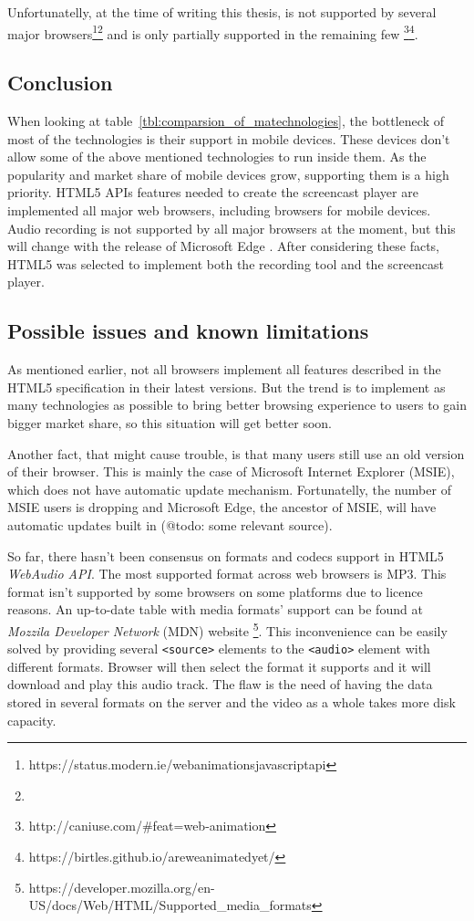 Unfortunatelly, at the time of writing this thesis, is not supported by several major browsers\footnote{https://status.modern.ie/webanimationsjavascriptapi}\footnote{} and is only partially supported in the remaining few \footnote{http://caniuse.com/\#feat=web-animation}\footnote{https://birtles.github.io/areweanimatedyet/}.

\subsection{Conclusion}
When looking at table~\ref{tbl:comparsion_of_matechnologies}, the bottleneck of most of the technologies is their support in mobile devices. These devices don't allow some of the above mentioned technologies to run inside them. As the popularity and market share of mobile devices grow, supporting them is a high priority. HTML5 APIs features needed to create the screencast player are implemented all major web browsers, including browsers for mobile devices. Audio recording is not supported by all major browsers at the moment, but this will change with the release of Microsoft Edge \cite{edge_getusermedia}. After considering these facts, HTML5 was selected to implement both the recording tool and the screencast player.

\subsection{Possible issues and known limitations}
As mentioned earlier, not all browsers implement all features described in the HTML5 specification in their latest versions. But the trend is to implement as many technologies as possible to bring better browsing experience to users to gain bigger market share, so this situation will get better soon.

Another fact, that might cause trouble, is that many users still use an old version of their browser. This is mainly the case of Microsoft Internet Explorer (MSIE), which does not have automatic update mechanism. Fortunatelly, the number of MSIE users is dropping and Microsoft Edge, the ancestor of MSIE, will have automatic updates built in (@todo: some relevant source).

So far, there hasn't been consensus on formats and codecs support in HTML5 \textit{WebAudio API}. The most supported format across web browsers is MP3. This format isn't supported by some browsers on some platforms due to licence reasons. An up-to-date table with media formats' support can be found at \textit{Mozzila Developer Network} (MDN) website  \cite{} \footnote{https://developer.mozilla.org/en-US/docs/Web/HTML/Supported\_media\_formats}. This inconvenience can be easily solved by providing several \verb|<source>| elements to the \verb|<audio>| element with different formats. Browser will then select the format it supports and it will download and play this audio track. The flaw is the need of having the data stored in several formats on the server and the video as a whole takes more disk capacity.

